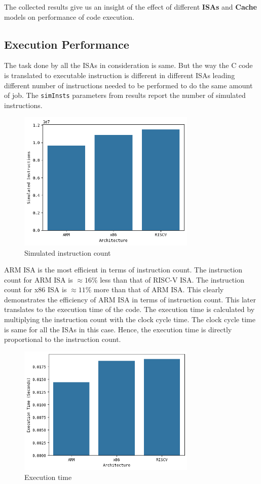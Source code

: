 The collected results give us an insight of the effect of different \textbf{ISAs} and \textbf{Cache} models on performance of code execution.

\subsection{Execution Performance}
The task done by all the ISAs in consideration is same. But the way the C code is translated to executable instruction is different in different ISAs leading different number of instructions needed to be performed to do the same amount of job. The \texttt{simInsts} parameters from results report the number of simulated instructions.


\begin{figure}[h]
	\centering
	\includegraphics[width=8.5cm]{figs/inst_count.png}
	\caption{Simulated instruction count}
	\label{fig:inst_count}
\end{figure}
ARM ISA is the most efficient in terms of instruction count. The instruction count for ARM ISA is $\approx 16\%$ less than that of RISC-V ISA. The instruction count for x86 ISA is $\approx 11\%$ more than that of ARM ISA. This clearly demonstrates the efficiency of ARM ISA in terms of instruction count.
This later translates to the execution time of the code. The execution time is calculated by multiplying the instruction count with the clock cycle time. The clock cycle time is same for all the ISAs in this case. Hence, the execution time is directly proportional to the instruction count.

\begin{figure}[h]
	\centering
	\includegraphics[width=8.5cm]{figs/exec.png}
	\caption{Execution time}
	\label{fig:exec_time}
\end{figure}

